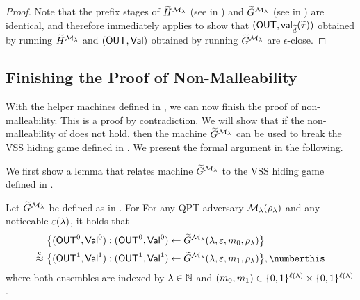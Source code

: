 \begin{proof}
    Note that the prefix stages of $\widetilde{H}^{\mathcal{M}_\lambda}$ (see  in ) and $\widetilde{G}^{\mathcal{M}_\lambda}$ (see  in ) are identical, and therefore  immediately applies to show that $(\mathsf{OUT}, \mathsf{val}_{\widetilde{d}}(\widetilde{\tau}))$ obtained by running $\widetilde{H}^{\mathcal{M}_\lambda}$ and $(\mathsf{OUT}, \mathsf{Val})$ obtained by running $\widetilde{G}^{\mathcal{M}_\lambda}$ are $\epsilon$-close.

\end{proof}


\subsection{Finishing the Proof of Non-Malleability}
\label{bbnmc:proof:fin} 

With the helper machines defined in , we can now finish the proof of non-malleability. This is a proof by contradiction. We will show that if the non-malleability of  does not hold, then the machine $\widetilde{G}^{\mathcal{M}_\lambda}$ can be used to break the VSS hiding game defined in . We present the formal argument in the following.


We first show a lemma that relates machine $\widetilde{G}^{\mathcal{M}_\lambda}$ to the VSS hiding game defined in .
\begin{lemma}\label{lem:bb-nmc:similarity:g:til}
Let $\widetilde{G}^{\mathcal{M}_\lambda}$ be defined as in . For For any QPT adversary $\mathcal{M}_\lambda(\rho_\lambda)$ and any noticeable $\varepsilon(\lambda)$, it holds that
    \begin{align*}
        &\big\{(\OUT^0, \Val^0):(\OUT^0, \Val^0) \gets \tilde{G}^{\mcal{M}_\secpar}(\secpar, \epsilon, m_0, \rho_\secpar)\big\} \\
        \cind ~&
        \big\{(\OUT^1, \Val^1):(\OUT^1, \Val^1) \gets \tilde{G}^{\mcal{M}_\secpar}(\secpar, \epsilon, m_1, \rho_\secpar)\big\}, \numberthis
    \end{align*}    
    where both ensembles are indexed by $\lambda \in \mathbb{N}$ and $(m_0,m_1) \in \{0,1\}^{\ell(\lambda)} \times \{0,1\}^{\ell(\lambda)}$. 
\end{lemma}

